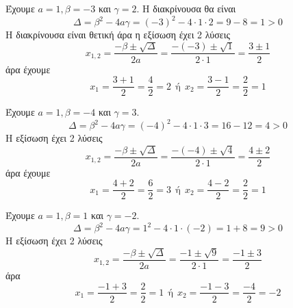 \begin{alist}
\item Έχουμε $ a=1,\beta=-3 $ και $ \gamma=2 $. Η διακρίνουσα θα είναι
\[ \Delta=\beta^2-4a\gamma=(-3)^2-4\cdot 1\cdot 2=9-8=1>0 \]
Η διακρίνουσα είναι θετική άρα η εξίσωση έχει 2 λύσεις
\[ x_{1,2}=\frac{-\beta\pm\sqrt{\Delta}}{2a}=\frac{-(-3)\pm\sqrt{1}}{2\cdot 1}=\frac{3\pm 1}{2} \]
άρα έχουμε
\[ x_1=\frac{3+1}{2}=\frac{4}{2}=2\ \ \text{ή}\ \ x_2=\frac{3-1}{2}=\frac{2}{2}=1 \]
\item Έχουμε $ a=1,\beta=-4 $ και $ \gamma=3 $.
\[ \Delta=\beta^2-4a\gamma=(-4)^2-4\cdot 1\cdot 3=16-12=4>0 \]
Η εξίσωση έχει 2 λύσεις
\[ x_{1,2}=\frac{-\beta\pm\sqrt{\Delta}}{2a}=\frac{-(-4)\pm\sqrt{4}}{2\cdot 1}=\frac{4\pm 2}{2} \]
άρα έχουμε
\[ x_1=\frac{4+2}{2}=\frac{6}{2}=3\ \ \text{ή}\ \ x_2=\frac{4-2}{2}=\frac{2}{2}=1 \]
\item Έχουμε $ a=1,\beta=1 $ και $ \gamma=-2 $.
\[ \Delta=\beta^2-4a\gamma=1^2-4\cdot 1\cdot(-2)=1+8=9>0 \]
Η εξίσωση έχει 2 λύσεις
\[ x_{1,2}=\frac{-\beta\pm\sqrt{\Delta}}{2a}=\frac{-1\pm\sqrt{9}}{2\cdot 1}=\frac{-1\pm 3}{2} \]
άρα
\[ x_1=\frac{-1+3}{2}=\frac{2}{2}=1\ \ \text{ή}\ \ x_2=\frac{-1-3}{2}=\frac{-4}{2}=-2 \]
\end{alist}
